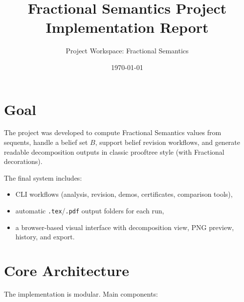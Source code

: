 \documentclass[11pt,a4paper]{article}
\title{Fractional Semantics Project\\Implementation Report}
\author{Project Workspace: Fractional Semantics}
\date{\today}
\begin{document}
\maketitle
\tableofcontents
\bigskip

\section{Goal}
The project was developed to compute Fractional Semantics values from sequents, handle a belief set $B$, support belief revision workflows, and generate readable decomposition outputs in classic prooftree style (with Fractional decorations).

The final system includes:
\begin{itemize}[leftmargin=1.5em]
  \item CLI workflows (analysis, revision, demos, certificates, comparison tools),
  \item automatic \texttt{.tex}/\texttt{.pdf} output folders for each run,
  \item a browser-based visual interface with decomposition view, PNG preview, history, and export.
\end{itemize}

\section{Core Architecture}
The implementation is modular. Main components:
\end{document}
